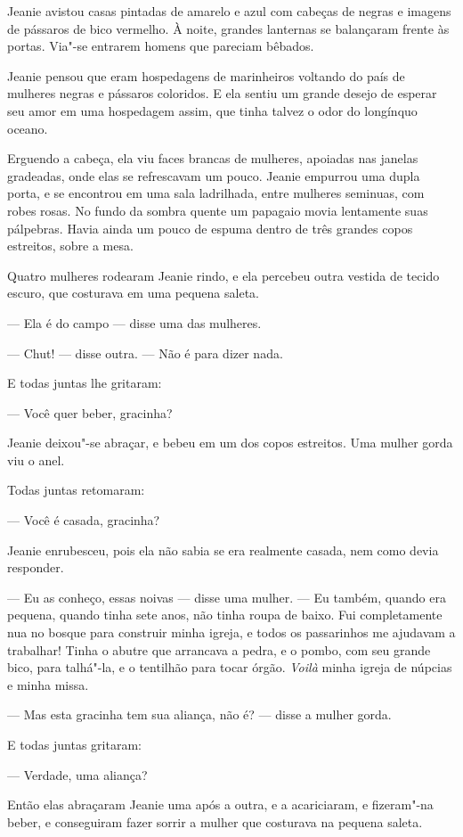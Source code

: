 Jeanie avistou casas pintadas de amarelo e azul com cabeças de negras e
imagens de pássaros de bico vermelho. À noite, grandes lanternas se
balançaram frente às portas. Via"-se entrarem homens que pareciam bêbados.

Jeanie pensou que eram hospedagens de marinheiros voltando do país de
mulheres negras e pássaros coloridos. E ela sentiu um grande desejo de
esperar seu amor em uma hospedagem assim, que tinha talvez o odor do
longínquo oceano.

Erguendo a cabeça, ela viu faces brancas de mulheres, apoiadas nas
janelas gradeadas, onde elas se refrescavam um pouco. Jeanie empurrou uma
dupla porta, e se encontrou em uma sala ladrilhada, entre mulheres
seminuas, com robes rosas. No fundo da sombra quente um papagaio movia
lentamente suas pálpebras. Havia ainda um pouco de espuma dentro de três
grandes copos estreitos, sobre a mesa.

Quatro mulheres rodearam Jeanie rindo, e ela percebeu outra vestida de
tecido escuro, que costurava em uma pequena saleta.

--- Ela é do campo --- disse uma das mulheres.

--- Chut! --- disse outra. --- Não é para dizer nada.

E todas juntas lhe gritaram:

--- Você quer beber, gracinha?

Jeanie deixou"-se abraçar, e bebeu em um dos copos estreitos. Uma mulher
gorda viu o anel.

Todas juntas retomaram:

--- Você é casada, gracinha?

Jeanie enrubesceu, pois ela não sabia se era realmente casada, nem como
devia responder.

--- Eu as conheço, essas noivas --- disse uma mulher.  --- Eu também, quando era
pequena, quando tinha sete anos, não tinha roupa de baixo. Fui
completamente nua no bosque para construir minha igreja, e todos os
passarinhos me ajudavam a trabalhar! Tinha o abutre que arrancava a pedra,
e o pombo, com seu grande bico, para talhá"-la, e o tentilhão para tocar
órgão. \textit{Voilà} minha igreja de núpcias e minha missa.

--- Mas esta gracinha tem sua aliança, não é? --- disse a mulher gorda.

E todas juntas gritaram:

--- Verdade, uma aliança?

Então elas abraçaram Jeanie uma após a outra, e a acariciaram, e
fizeram"-na beber, e conseguiram fazer sorrir a mulher que costurava na
pequena saleta.

